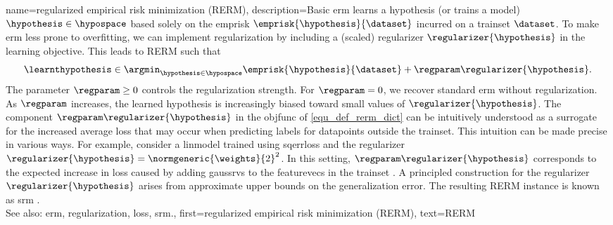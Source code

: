 {name={regularized empirical risk minimization (RERM)}, 
	description={Basic \gls{erm} learns a \gls{hypothesis} (or trains a \gls{model}) $\hypothesis \in \hypospace$ 
		based solely on the \gls{emprisk} $\emprisk{\hypothesis}{\dataset}$ incurred on a \gls{trainset} $\dataset$. 
		To make \gls{erm} less prone to \gls{overfitting}, we can implement \gls{regularization} by 
		including a (scaled) \gls{regularizer} $\regularizer{\hypothesis}$ in the learning objective. 
		This leads to RERM such that
		\begin{equation}
			\label{equ_def_rerm_dict}
			\learnthypothesis \in \argmin_{\hypothesis \in \hypospace} \emprisk{\hypothesis}{\dataset} + \regparam \regularizer{\hypothesis}.
		\end{equation}
		The \gls{parameter} $\regparam \geq 0$ controls the \gls{regularization} strength. 
		For $\regparam = 0$, we recover standard \gls{erm} without \gls{regularization}. As $\regparam$ increases, the 
		learned \gls{hypothesis} is increasingly biased toward small values of $\regularizer{\hypothesis}$. 
		The component $\regparam \regularizer{\hypothesis}$ in the \gls{objfunc} of \eqref{equ_def_rerm_dict} 
		can be intuitively understood as a surrogate for the increased average \gls{loss} that may 
		occur when predicting \glspl{label} for \glspl{datapoint} outside the \gls{trainset}. This intuition  
		can be made precise in various ways. For example, consider a \gls{linmodel} trained using \gls{sqerrloss} 
		and the \gls{regularizer} $\regularizer{\hypothesis} = \normgeneric{\weights}{2}^{2}$. 
		In this setting, $\regparam \regularizer{\hypothesis}$ corresponds to the expected increase in \gls{loss} 
		caused by adding \glspl{gaussrv} to the \glspl{featurevec} in the \gls{trainset} 
		\cite[Ch. 3]{MLBasics}.
		A principled construction for the \gls{regularizer} $\regularizer{\hypothesis}$ 
		arises from approximate upper bounds on the \gls{generalization} error. The resulting 
		RERM instance is known as \gls{srm} \cite[Sec. 7.2]{ShalevShwartz2009}.
				\\
		See also: \gls{erm}, \gls{regularization}, \gls{loss}, \gls{srm}.}, 
	first={regularized empirical risk minimization (RERM)},
	text={RERM} 
}

